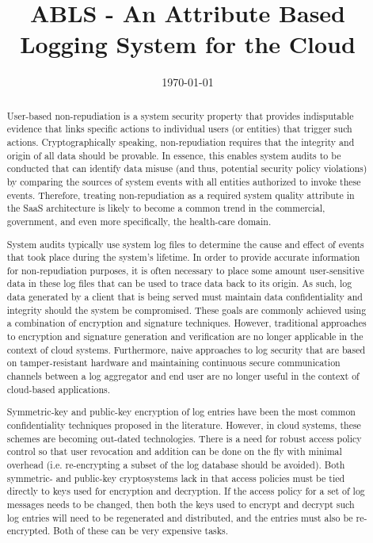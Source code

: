 \documentclass{sig-alternate}
\begin{document}
\title{ABLS - An Attribute Based Logging System for the Cloud}
\author{
}
\date{\today}
\maketitle
\begin{abstract}

User-based non-repudiation is a system security property that provides indisputable evidence that links
specific actions to individual users (or entities) that trigger such actions. Cryptographically speaking, non-repudiation requires that the integrity and 
origin of all data should be provable. In essence, this enables system audits to be conducted that can
identify data misuse (and thus, potential security policy violations) by comparing the sources of system events
with all entities authorized to invoke these events. Therefore, treating non-repudiation as a required system 
quality attribute in the SaaS architecture is likely to become a common trend in the commercial, 
government, and even more specifically, the health-care domain.

System audits typically use system log files to determine the cause and effect of events that took 
place during the system's lifetime. In order to provide accurate information for non-repudiation purposes,
it is often necessary to place some amount user-sensitive data in these log files that can be used
to trace data back to its origin. As such, log data generated by a client that is being served must
maintain data confidentiality and integrity should the system be compromised. These goals are commonly achieved
using a combination of encryption and signature techniques. However, traditional approaches to
encryption and signature generation and verification are no longer applicable in the context of cloud
systems. Furthermore, naive approaches to log security that are based on tamper-resistant hardware and 
maintaining continuous secure communication channels between a log aggregator and end user are no longer useful in 
the context of cloud-based applications. 

Symmetric-key and public-key encryption of log entries have been the most common confidentiality techniques 
proposed in the literature. However, in cloud systems, these schemes are becoming out-dated technologies.
There is a need for robust access policy control so that user revocation and addition can be done on the fly
with minimal overhead (i.e. re-encrypting a subset of the log database should be avoided). Both symmetric- and 
public-key cryptosystems lack in that access policies must be tied directly to keys used for
encryption and decryption. If the access policy for a set of log messages needs to be changed, then both the keys used to
encrypt and decrypt such log entries will need to be regenerated and distributed, and the entries must also
be re-encrypted. Both of these can be very expensive tasks. 


\end{abstract}
\end{document}
